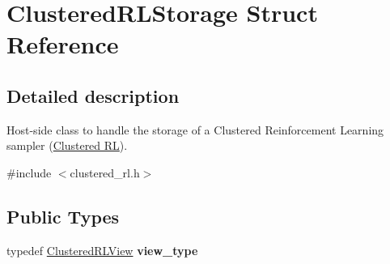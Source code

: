 \hypertarget{struct_clustered_r_l_storage}{}\section{Clustered\+R\+L\+Storage Struct Reference}
\label{struct_clustered_r_l_storage}


\subsection{Detailed description}
Host-\/side class to handle the storage of a Clustered Reinforcement Learning sampler (\hyperlink{group___clustered_r_l_module}{Clustered RL}). 

{\ttfamily \#include $<$clustered\+\_\+rl.\+h$>$}

\subsection*{Public Types}
\begin{DoxyCompactItemize}
\item 
\mbox{\label{struct_clustered_r_l_storage_a3d4bd4d60bfb6d6dae7079ffebeaea83}} 
typedef \hyperlink{struct_clustered_r_l_view}{Clustered\+R\+L\+View} {\bfseries view\+\_\+type}
\end{DoxyCompactItemize}
